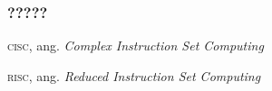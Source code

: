 \documentclass[10pt,t]{beamer}
\begin{document}









\begin{frame}
  \frametitle{?????}


  \textsc{cisc}, ang. \textit{Complex Instruction Set Computing}

  \textsc{risc}, ang. \textit{Reduced Instruction Set Computing}


\end{frame}







































\end{document}
